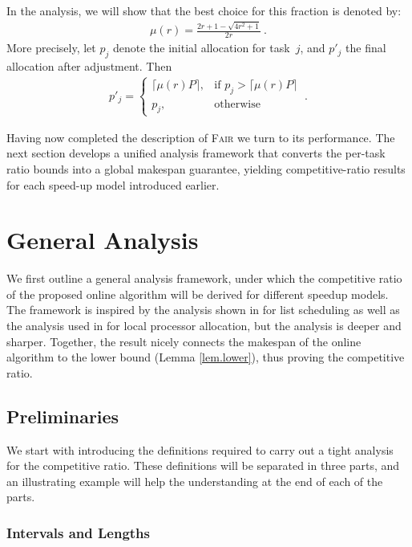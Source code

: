 \documentclass{article}
\newcommand\fair{\textsc{Fair}\xspace}
\newcommand\rratio{r\xspace}
\begin{document}
In the analysis, we will show that the best choice for this fraction is denoted by:
\begin{align}
\label{eq.muR}
\mu(\rratio)=\frac{2\rratio+1-\sqrt{4\rratio^2+1}}{2\rratio}\ .
\end{align}
More precisely, let $p_j$ denote the initial allocation for task~$j$, and $p'_j$ the final allocation after adjustment. Then
\begin{align}
\label{eq.adjust}
p'_j = \begin{cases}
\lceil \mu(\rratio) P \rceil,  & \text{if } p_j > \lceil \mu(\rratio) P \rceil \\
p_j, & \text{otherwise}
\end{cases} \ .
\end{align}

Having now completed the description of \fair we turn to its performance. The next section develops a unified analysis framework that converts the per-task ratio bounds into a global makespan guarantee, yielding competitive-ratio results for each speed-up model introduced earlier.

\section{General Analysis}\label{sec.analysis}

We first outline a general analysis framework, under which the competitive ratio of the proposed online algorithm will be derived for different speedup models.
The framework is inspired by the analysis shown in \cite{Lepere01_DAG, Jansen06_DAG, Jansen05_concave} for list scheduling as well as the analysis used in \cite{ICPP22, TOPC24} for local processor allocation, but the analysis is deeper and sharper. Together, the result nicely connects the makespan of the online algorithm to the lower bound (Lemma \ref{lem.lower}), thus proving the competitive ratio.

\subsection{Preliminaries}



We start with introducing the definitions required to carry out a tight analysis for the competitive ratio. These definitions will be separated in three parts, and an illustrating example will help the understanding at the end of each of the parts.


\subsubsection{Intervals and Lengths} 
\end{document}
